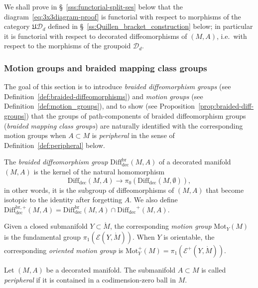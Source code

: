 \documentclass[AHL,Unicode,published]{cedram}
\newcommand{\Int}{\mathring}
\newcommand{\Mot}{\mathrm{Mot}}
\newcommand{\rdec}{\mathrm{dec}}
\newcommand{\fU}{\ensuremath{\mathfrak{U}}}
\newcommand{\cD}{\mathcal{D}}
\newcommand{\cE}{\mathcal{E}}
\newcommand{\too}{\ensuremath{\longrightarrow}}
\newcommand{\diffdec}{\ensuremath{\mathrm{Diff}_{\rdec}}}
\newcommand{\diffdecbr}{\ensuremath{\mathrm{Diff}_{\rdec}^{\mathrm{br}}}}
\newcommand{\diffdecbrplus}{\ensuremath{\mathrm{Diff}_{\rdec}^{\mathrm{br},+}}}
\begin{document}
\begin{rema}
We shall prove in \S~\ref{sss:functorial-split-ses} below that the diagram~\eqref{eq:3x3diagram-proof} is functorial with respect to morphisms of the category $\fU\cD_{d}$ defined in \S~\ref{ss:Quillen_bracket_construction} below; in particular it is functorial with respect to decorated diffeomorphisms of $(M,A)$, i.e.~with respect to the morphisms of the groupoid $\cD_{d}$.
\end{rema}


\subsubsection{Motion groups and braided mapping class groups}\label{sec:braided-mcg}

The goal of this section is to introduce \emph{braided diffeomorphism groups} (see Definition~\ref{def:braided-diffeomorphisms}) and \emph{motion groups} (see Definition~\ref{def:motion_groups}), and to show (see Proposition~\ref{prop:braided-diff-groups}) that the groups of path-components of braided diffeomorphism groups (\emph{braided mapping class groups}) are naturally identified with the corresponding motion groups when $A \subset M$ is \emph{peripheral} in the sense of Definition~\ref{def:peripheral} below.

\begin{defi}\label{def:braided-diffeomorphisms}
The \emph{braided diffeomorphism group} $\diffdecbr(M,A)$ of a decorated manifold $(M,A)$ is the kernel of the natural homomorphism
\[
\diffdec(M,A) \too \pi_{0}\left(\diffdec(M,\emptyset)\right),
\]
in other words, it is the subgroup of diffeomorphisms of $(M,A)$ that become isotopic to the identity after forgetting $A$. We also define $\diffdecbrplus(M,A) = \diffdecbr(M,A) \cap \diffdec^{+}(M,A)$.
\end{defi}

\begin{defi}\label{def:motion_groups}
Given a closed submanifold $Y \subset \Int{M}$, the corresponding \emph{motion group} $\Mot_Y(M)$ is the fundamental group $\pi_{1}(\cE(Y,\Int{M}))$. When $Y$ is orientable, the corresponding \emph{oriented motion group} is $\Mot_Y^{+}(M) = \pi_{1}(\cE^{+}(Y,\Int{M}))$.
\end{defi}

\begin{defi}\label{def:peripheral}
Let $(M,A)$ be a decorated manifold. The submanifold $A \subset M$ is called \emph{peripheral} if it is contained in a codimension-zero ball in $M$.
\end{defi}
\end{document}
